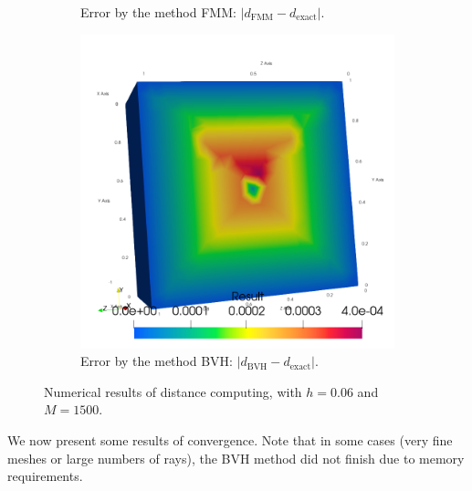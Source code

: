 \begin{figure}
\begin{subfigure}{0.33\textwidth}
        \caption{Error by the method FMM: $|d_\mathrm{FMM}-d_\mathrm{exact}|$.}
        \label{fig:specs:app-feelpp-distance:results:error-fmm}
    \end{subfigure}
    \begin{subfigure}{0.33\textwidth}
        \centering
        \includegraphics[width=\columnwidth]{graphics/feelpp/feelpp-benchmark-distance-errorBVH}
        \caption{Error by the method BVH: $|d_\mathrm{BVH}-d_\mathrm{exact}|$.}
        \label{fig:specs:app-feelpp-distance:results:error-bvh}
    \end{subfigure}
    \caption{Numerical results of distance computing, with $h=0.06$ and $M=1500$.}
    \label{fig:specs:app-feelpp-distance:results}
\end{figure}

We now present some results of convergence.
Note that in some cases (very fine meshes or large numbers of rays), the BVH method did not finish due to memory requirements.


\dataTimeBVHnp
{}\dataSpeedupBVHnp
{}\dataTimeFMMnp
{}\dataSpeedupFMMnp
{}\dataTimeBVHM
{}\dataConvBVH
{}\dataConvFMM



